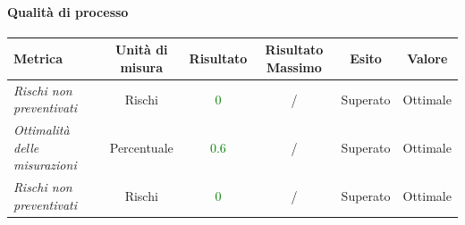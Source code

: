 \paragraph{Qualità di processo}
\begin{longtable}{|>{\centering}m{5cm}|c|c|c|c|c|}
\hline
\textbf{Metrica} & \textbf{Unità di misura} & \textbf{Risultato} & \textbf{Risultato Massimo} & \textbf{Esito} & \textbf{Valore}\\
\hline
\endhead

\emph{Rischi non preventivati} & {Rischi} & \textcolor{Green}{0} & / & Superato & Ottimale\\ \hline
\emph{Ottimalità delle misurazioni} & {Percentuale} & \textcolor{Green}{0.6} & / & Superato & Ottimale \\ \hline
\emph{Rischi non preventivati} & {Rischi} & \textcolor{Green}{0} & / & Superato & Ottimale\\ \hline

\end{longtable}
